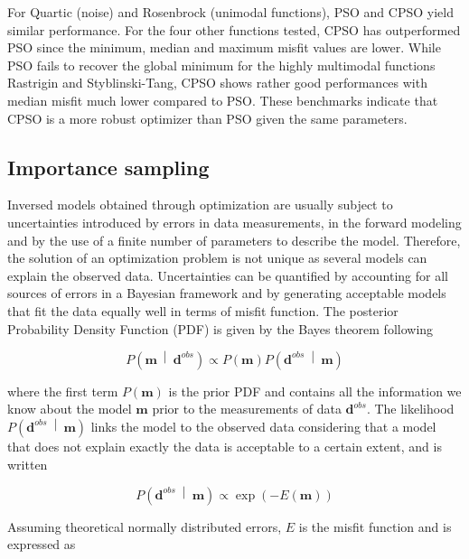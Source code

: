 \noindent For Quartic (noise) and Rosenbrock (unimodal functions), PSO and CPSO yield similar performance. For the four other functions tested, CPSO has outperformed PSO since the minimum, median and maximum misfit values are lower. While PSO fails to recover the global minimum for the highly multimodal functions Rastrigin and Styblinski-Tang, CPSO shows rather good performances with median misfit much lower compared to PSO. These benchmarks indicate that CPSO is a more robust optimizer than PSO given the same parameters.


\subsection{Importance sampling}
\label{ssec:importance_sampling}

Inversed models obtained through optimization are usually subject to uncertainties introduced by errors in data measurements, in the forward modeling and by the use of a finite number of parameters to describe the model. Therefore, the solution of an optimization problem is not unique as several models can explain the observed data. Uncertainties can be quantified by accounting for all sources of errors in a Bayesian framework and by generating acceptable models that fit the data equally well in terms of misfit function. The posterior Probability Density Function (PDF) is given by the Bayes theorem following

\begin{equation}
	P \left( \mathbf{m} \ \middle| \  \mathbf{d}^{obs} \right) \propto P \left( \mathbf{m} \right) P \left( \mathbf{d}^{obs} \ \middle| \  \mathbf{m} \right)
	\label{eq:bayes_theorem}
\end{equation}

\noindent where the first term $P \left( \mathbf{m} \right)$ is the prior PDF and contains all the information we know about the model $\mathbf{m}$ prior to the measurements of data $\mathbf{d}^{obs}$. The likelihood $P \left( \mathbf{d}^{obs} \ \middle| \  \mathbf{m} \right)$ links the model to the observed data considering that a model that does not explain exactly the data is acceptable to a certain extent, and is written

\begin{equation}
	P \left( \mathbf{d}^{obs} \ \middle| \  \mathbf{m} \right) \propto \exp \left( - E \left( \mathbf{m} \right) \right)
	\label{eq:likelihood}
\end{equation}

\noindent Assuming theoretical normally distributed errors, $E$ is the misfit function and is expressed as

